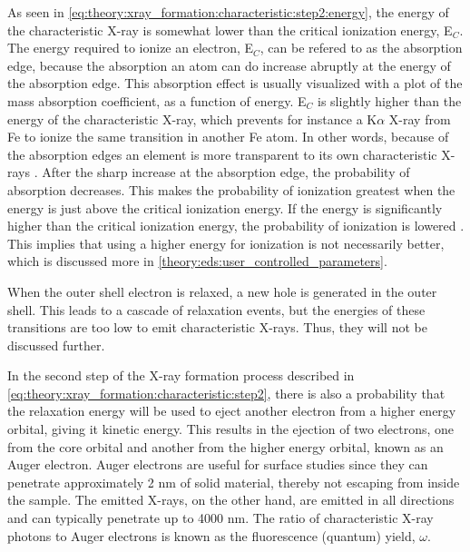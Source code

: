 As seen in \cref{eq:theory:xray_formation:characteristic:step2:energy}, the energy of the characteristic X-ray is somewhat lower than the critical ionization energy, E$_C$.
The energy required to ionize an electron, E$_C$, can be refered to as the absorption edge, because the absorption an atom can do increase abruptly at the energy of the absorption edge.
This absorption effect is usually visualized with a plot of the mass absorption coefficient, as a function of energy.
E$_C$ is slightly higher than the energy of the characteristic X-ray, which prevents for instance a K$\alpha$ X-ray from Fe to ionize the same transition in another Fe atom.
In other words, because of the absorption edges an element is more transparent to its own characteristic X-rays \cite[Ch. 4.4]{goldstein_scanning_2018}.
After the sharp increase at the absorption edge, the probability of absorption decreases.
This makes the probability of ionization greatest when the energy is just above the critical ionization energy.
If the energy is significantly higher than the critical ionization energy, the probability of ionization is lowered \cite[p. 78]{curry_radiology_k_absorption}.
This implies that using a higher energy for ionization is not necessarily better, which is discussed more in \cref{theory:eds:user_controlled_parameters}.


When the outer shell electron is relaxed, a new hole is generated in the outer shell.
This leads to a cascade of relaxation events, but the energies of these transitions are too low to emit characteristic X-rays.
Thus, they will not be discussed further.


In the second step of the X-ray formation process described in \cref{eq:theory:xray_formation:characteristic:step2}, there is also a probability that the relaxation energy will be used to eject another electron from a higher energy orbital, giving it kinetic energy.
This results in the ejection of two electrons, one from the core orbital and another from the higher energy orbital, known as an Auger electron.
Auger electrons are useful for surface studies since they can penetrate approximately 2 nm of solid material, thereby not escaping from inside the sample.
The emitted X-rays, on the other hand, are emitted in all directions and can typically penetrate up to 4000 nm.%
The ratio of characteristic X-ray photons to Auger electrons is known as the fluorescence (quantum) yield, $\omega$.

